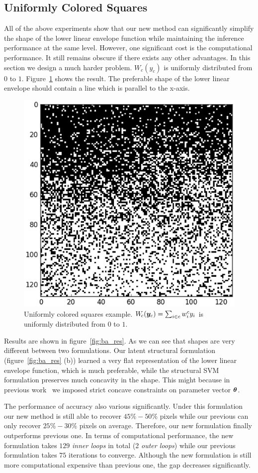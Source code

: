 \bigskip
\bigskip
\bigskip
\bigskip
\bigskip
\bigskip

\subsection{Uniformly Colored Squares}
\label{sec:unif-distr-squar}

All of the above experiments show that our new method can
significantly simplify the shape of the lower linear envelope
function while maintaining the inference performance at the same
level. However, one significant cost is the computational
performance. It still remains obscure if there exists any other
advantages. In this section we design a much harder problem.
$W_c(y_c)$ is uniformly distributed from $0$ to $1$.
Figure~\ref{fig:ba_gt} shows the result. The preferable shape of
the lower linear envelope should contain a line which is parallel
to the x-axis.

\begin{figure}[t]
  \centering
  \includegraphics[width=0.5\columnwidth]{Experiments/figures/ba_gt.png}
  \caption{\label{fig:ba_gt} Uniformly colored squares example.
    $W_{\!c}({\bm{y}}_c) = \sum_{i \in c} w^c_i y_i$ is uniformly
    distributed from $0$ to $1$.}
\end{figure}

Results are shown in figure~\ref{fig:ba_res}. As we can see
that shapes are very different between two formulations. Our
latent structural formulation (figure~\ref{fig:ba_res} (b))
learned a very flat representation of the lower linear envelope
function, which is much preferable, while the structural SVM
formulation preserves much concavity in the shape. This might
because in previous work~\cite{gouldlearning,Gould:ICML2011}
we imposed strict concave constraints on parameter vector
${\bm{\theta}}$.

The performance of accuracy also various significantly. Under
this formulation our new method is still able to recover
$45\%-50\%$ pixels while our previous can only recover
$25\%-30\%$ pixels on average. Therefore, our new formulation
finally outperforms previous one. In terms of computational
performance, the new formulation takes $129$ \emph{inner loops}
in total (2 \emph{outer loops}) while our previous formulation
takes $75$ iterations to converge. Although the new formulation
is still more computational expensive than previous one, the gap
decreases significantly.

